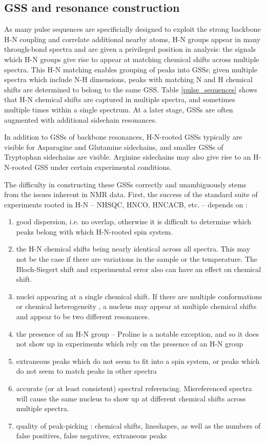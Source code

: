 \subsection{GSS and resonance construction}
As many pulse sequences are specificially designed to exploit the strong
backbone H-N coupling and correlate additional nearby atoms, H-N groups appear 
in many through-bond spectra and are given a privileged position in analysis: 
the signals which H-N groups give rise to appear at matching chemical shifts
across multiple spectra.
This H-N matching enables grouping of peaks into GSSs; given multiple spectra
which include N-H dimensions, peaks with matching N and H chemical shifts are
determined to belong to the same GSS.
Table \ref{pulse_sequences} shows that H-N chemical shifts are captured in 
multiple spectra, and sometimes multiple times within a single spectrum.
At a later stage, GSSs are often augmented with additional sidechain resonances.
	
In addition to GSSs of backbone resonances, H-N-rooted GSSs typically are 
visible for Asparagine and Glutamine sidechains, and smaller GSSs of 
Tryptophan sidechains are visible.  Arginine sidechains may also give rise 
to an H-N-rooted GSS under certain experimental conditions. 

The difficulty in constructing these GSSs correctly and unambiguously stems 
from the issues inherent in NMR data.  First, the success of the standard 
suite of experiments rooted in H-N -- NHSQC, HNCO, HNCACB, etc. -- depends 
on \cite{autoassign1997}: %
\begin{enumerate}
  \item good dispersion, i.e. no overlap, otherwise it is difficult to determine 
    which peaks belong with which H-N-rooted spin system.
  \item the H-N chemical shifts being nearly identical across all spectra.  
    This may not be the case if there are variations in the sample or the 
    temperature.  The Bloch-Siegert shift and experimental error also can have 
    an effect on chemical shift.
  \item nuclei appearing at a single chemical shift.  If there are multiple 
    conformations or chemical heterogeneity \cite{autoassign1997}, 
    a nucleus may appear at multiple chemical shifts and appear to be two 
    different resonances.
  \item the presence of an H-N group -- Proline is a notable exception, and 
    so it does not show up in experiments which rely on the presence of an H-N group
  \item extraneous peaks which do not seem to fit into a spin system, or 
    peaks which do not seem to match peaks in other spectra
  \item accurate (or at least consistent) spectral referencing.  
    Misreferenced spectra will cause the same nucleus to show up at different 
    chemical shifts across multiple spectra.
  \item quality of peak-picking \cite{autoassign1997, mars}: 
    chemical shifts, lineshapes, as well as the numbers of 
    false positives, false negatives, extraneous peaks
\end{enumerate}

